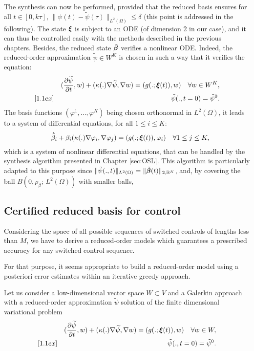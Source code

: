 The synthesis can now be performed, provided that the reduced basis 
ensures for all $t \in [0,k\tau]$, $\|\psi(t)-\tilde\psi(\tau)\|_{L^2(\Omega)} \leq \delta$
(this point is addressed in the following).
The state $\bm{\xi}$ is subject to an ODE (of dimension 2 in our case), 
and it can thus be controlled easily with the methods described in the previous chapters.
Besides, the reduced state $\tilde {\bm{\beta}}$ verifies a nonlinear ODE.
Indeed, the reduced-order approximation $\tilde \psi \in W^K$ is chosen in such
a way that it verifies the equation:
\begin{eqnarray}
&& (\frac{\partial \widetilde \psi}{\partial t},w) + (\kappa(.)\nabla \widetilde\psi,\nabla w)
= (g(.;\bm{\xi}(t)),w) \quad \forall w \in W^K, \label{eq:16} \\ [1.1ex]
&& \tilde \psi(.,t=0) = \tilde \psi^0. \label{eq:red_dev1}
\end{eqnarray}
The basis functions $\left(\varphi^1,...,\varphi^K\right)$ being chosen orthonormal
in $L^2 ( \Omega)$, it leads to a system of differential equations, for all $1\leq i \leq K$:
\begin{eqnarray}
&&  \dot {\tilde{\beta}}_i + \beta_i(\kappa(.)\nabla \varphi_i,\nabla \varphi_j)
= (g(.;\bm{\xi}(t)),\varphi_i) \quad \forall 1\leq j \leq K, \label{eq:red_dev2}
\end{eqnarray}
which is a system of nonlinear differential equations, that can be handled 
by the synthesis algorithm presented in Chapter \ref{sec:OSL}. This algorithm
is particularly adapted to this purpose since 
$\|\tilde \psi(.,t)\|_{L^2(\Omega)} = \|\tilde{\bm{\beta}}(t)\|_{2,\mathbb{R}^K}$,
and, by covering the ball $B(0,\rho_\beta;\, L^2(\Omega))$ with smaller 
balls, 

%
\subsection{Certified reduced basis for control}
%
Considering the space of all possible sequences of switched controls of lengths less than $M$,
we have to derive a reduced-order models which guarantees a prescribed accuracy for any
switched control sequence. \medskip

For that purpose, it seems appropriate to build a reduced-order model using a 
posteriori error estimates within an iterative greedy approach. \medskip

Let us consider a low-dimensional vector space $W\subset V$ and a Galerkin 
approach with a reduced-order approximation $\tilde \psi$ solution of 
the finite dimensional variational problem
%
\begin{eqnarray}
&& (\frac{\partial \widetilde \psi}{\partial t},w) + (\kappa(.)\nabla \widetilde\psi,\nabla w)
= (g(.;\bm{\xi}(t)),w) \quad \forall w \in W, \label{eq:16} \\ [1.1ex]
&& \tilde \psi(.,t=0) = \tilde \psi^0. \label{eq:17}
\end{eqnarray}
%
